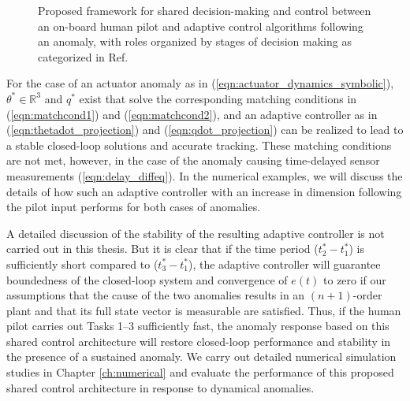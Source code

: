 \begin{figure}[h]

	\caption{Proposed framework for shared decision-making and control between an on-board human pilot and adaptive control algorithms following an anomaly, with roles organized by stages of decision making as categorized in Ref.~\cite{parasuraman2000model}}
	\label{fig:response_flow}
\end{figure}

For the case of an actuator anomaly as in (\ref{eqn:actuator_dynamics_symbolic}), $\theta^* \in \mathbb{R}^3$ and $q^*$ exist that solve the corresponding matching conditions in (\ref{eqn:matchcond1}) and (\ref{eqn:matchcond2}), and an adaptive controller as in (\ref{eqn:thetadot_projection}) and (\ref{eqn:qdot_projection}) can be realized to lead to a stable closed-loop solutions and accurate tracking. These matching conditions are not met, however, in the case of the anomaly causing time-delayed sensor measurements (\ref{eqn:delay_diffeq}). In the numerical examples, we will discuss the details of how such an adaptive controller with an increase in dimension following the pilot input performs for both cases of anomalies. 

A detailed discussion of the stability of the resulting adaptive controller is not carried out in this thesis. But it is clear that if the time period ($t_2^* - t_1^*$) is sufficiently short compared to ($t_3^* - t_1^*$), the adaptive controller will guarantee boundedness of the closed-loop system and convergence of $e(t)$ to zero if our assumptions that the cause of the two anomalies results in an $(n+1)$-order plant and that its full state vector is measurable are satisfied. Thus, if the human pilot carries out Tasks 1--3 sufficiently fast, the anomaly response based on this shared control architecture will restore closed-loop performance and stability in the presence of a sustained anomaly. We carry out detailed numerical simulation studies in Chapter \ref{ch:numerical} and evaluate the performance of this proposed shared control architecture in response to dynamical anomalies.
